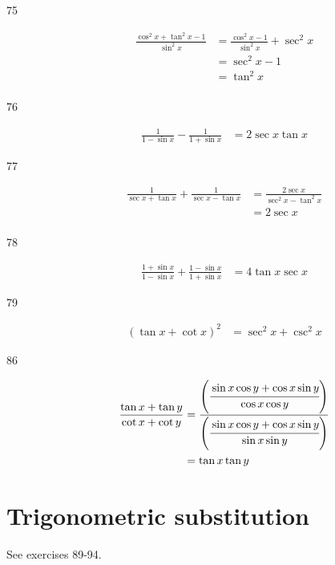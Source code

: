 \documentclass{exam}
\begin{document}
\begin{description}
    \item[75]
      \begin{align*}
        \frac{\cos^2 x + \tan^2 x - 1}{\sin^2 x} & = \frac{\cos^2 x - 1}{\sin^2 x} + \sec^2 x \\
                                                 & =  \sec^2 x - 1 \\
                                                 & = \tan^2 x \\
      \end{align*}
        
    \item[76]
      \begin{align*}
        \frac{1}{1 - \sin x} - \frac{1}{1 + \sin x} &= 2 \sec x \tan x
      \end{align*}
        
    \item[77]
      \begin{align*}
        \frac{1}{\sec x + \tan x} + \frac{1}{\sec x - \tan x} & = \frac{2 \sec x }{\sec^2 x - \tan^2 x} \\
                                                              & = 2 \sec x \\
      \end{align*}

    \item[78]
      \begin{align*}
        \frac{1 + \sin x}{1 - \sin x} + \frac{1 - \sin x}{1 + \sin x} & = 4 \tan x \sec x
      \end{align*}

    \item[79]
      \begin{align*}
        (\tan x + \cot x)^2 &= \sec^2 x + \csc^2 x
      \end{align*}

    \item[86]
      \begin{align*}
        \frac{\tan x + \tan y}{\cot x + \cot y} &= 
          \frac{ \left( \cfrac{\sin x \cos y + \cos x \sin y }{\cos x \cos y} \right) }{ \left( \cfrac{\sin x \cos y + \cos x \sin y}{\sin x \sin y} \right)} \\
          &= \tan x \tan y \\
      \end{align*}



  \end{description}
  \section{Trigonometric substitution}
  See exercises 89-94.  
\end{document}
